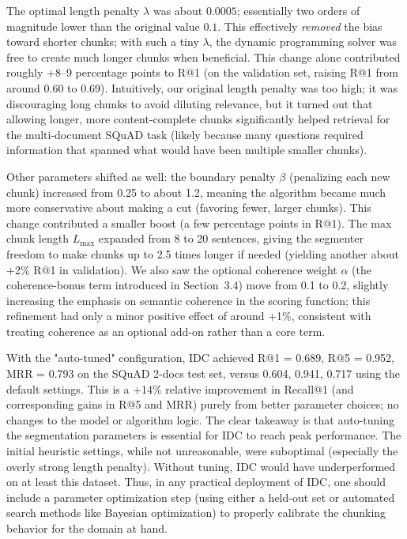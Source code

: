 \documentclass[12pt,a4paper]{report}
\begin{document}
The optimal length penalty $\lambda$ was about $0.0005$; essentially two orders of magnitude lower than the original value $0.1$. This effectively \textit{removed} the bias toward shorter chunks; with such a tiny $\lambda$, the dynamic programming solver was free to create much longer chunks when beneficial. This change alone contributed roughly +8--9 percentage points to R@1 (on the validation set, raising R@1 from around 0.60 to 0.69). Intuitively, our original length penalty was too high; it was discouraging long chunks to avoid diluting relevance, but it turned out that allowing longer, more content-complete chunks significantly helped retrieval for the multi-document SQuAD task (likely because many questions required information that spanned what would have been multiple smaller chunks).

Other parameters shifted as well: the boundary penalty $\beta$ (penalizing each new chunk) increased from 0.25 to about 1.2, meaning the algorithm became much more conservative about making a cut (favoring fewer, larger chunks). This change contributed a smaller boost (a few percentage points in R@1). The max chunk length $L_{\max}$ expanded from 8 to 20 sentences, giving the segmenter freedom to make chunks up to 2.5 times longer if needed (yielding another about +2\% R@1 in validation). We also saw the optional coherence weight $\alpha$ (the coherence-bonus term introduced in Section~3.4) move from 0.1 to 0.2, slightly increasing the emphasis on semantic coherence in the scoring function; this refinement had only a minor positive effect of around +1\%, consistent with treating coherence as an optional add-on rather than a core term. 

With the "auto-tuned" configuration, IDC achieved R@1 = 0.689, R@5 = 0.952, MRR = 0.793 on the SQuAD 2-docs test set, versus 0.604, 0.941, 0.717 using the default settings. This is a +14\% relative improvement in Recall@1 (and corresponding gains in R@5 and MRR) purely from better parameter choices; no changes to the model or algorithm logic. The clear takeaway is that auto-tuning the segmentation parameters is essential for IDC to reach peak performance. The initial heuristic settings, while not unreasonable, were suboptimal (especially the overly strong length penalty). Without tuning, IDC would have underperformed on at least this dataset. Thus, in any practical deployment of IDC, one should include a parameter optimization step (using either a held-out set or automated search methods like Bayesian optimization) to properly calibrate the chunking behavior for the domain at hand.
\end{document}
